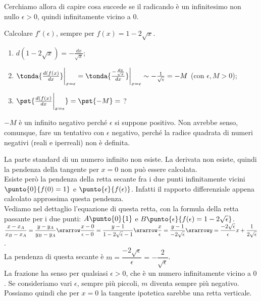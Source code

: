 Cerchiamo allora di capire cosa succede se il radicando è un infinitesimo 
non 
nullo $\epsilon>0$, quindi infinitamente vicino a 0.

\begin{esempio}
Calcolare $f'(\epsilon)$, sempre per  $f(x)=1-2\sqrt{x}$.\\
\begin{enumerate} [noitemsep]
 \item $d(1-2\sqrt{x})=-\frac{dx}{\sqrt{x}}$;
 \item $\tonda{\frac{d(f(x)}{dx}}\bigg|_{x=\epsilon}=
  \tonda{\frac{-\frac{dx}{\sqrt{x}}}{dx}}\bigg|_{x=\epsilon}\sim
  -\frac{1}{\sqrt{\epsilon}}=-M$ (con $\epsilon, M >0$);
 \item $\pst{\frac{d(f(x)}{dx}\bigg|_{x=\epsilon}}=\pst{-M}=$ ?
\end{enumerate} 
\begin{osservazione}
 $-M$ è un infinito negativo perché $\epsilon$ si suppone positivo. Non 
avrebbe  senso, comunque, fare un tentativo con $\epsilon$ negativo, perché la 
radice quadrata di numeri negativi (reali e iperreali) non è definita.\\
\end{osservazione} 

La parte standard di un numero infinito non esiste. La derivata non esiste, 
quindi la pendenza della tangente per $x=0$ non può essere calcolata.\\
Esiste però la pendenza della retta secante
fra i due punti infinitamente vicini $\punto{0}{f(0)=1}$ e 
$\punto{\epsilon}{f(\epsilon)}$. Infatti il rapporto 
differenziale appena calcolato approssima questa pendenza.\\
Vediamo nel dettaglio l'equazione di questa retta, con la formula della
retta passante per i due punti: $A\punto{0}{1}$ e 
$B\punto{\epsilon}{f(\epsilon)=1-2\sqrt{\epsilon}}$.\\
$\dfrac{x-x_A}{x_B-x_A}=\dfrac{y-y_A}{y_B-y_A}\srarrow
\dfrac{x-0}{\epsilon-0}=\dfrac{y-1}{1-2\sqrt{\epsilon}-1}\srarrow
\dfrac{x}{\epsilon}=\dfrac{y-1}{-2\sqrt{\epsilon}}\srarrow
y=\dfrac{-2\sqrt{\epsilon}}{\epsilon}x+\dfrac{1}{2\sqrt{\epsilon}}$.\\
La pendenza di questa secante è $m=\dfrac{-2\sqrt{\epsilon}}{\epsilon}=
-\dfrac{2}{\sqrt{\epsilon}}$.\\
La frazione ha senso per qualsiasi $\epsilon>0$, che è un numero 
infinitamente vicino a $0$.  Se consideriamo vari $\epsilon$, sempre 
più piccoli, $m$ diventa sempre più negativo. Possiamo quindi che per $x=0$
la tangente ipotetica sarebbe una retta verticale.\\
\end{esempio}

